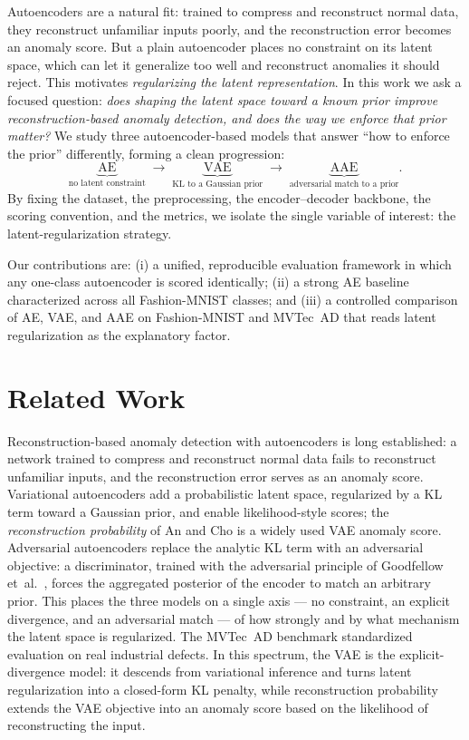 \documentclass[11pt]{article}
\begin{document}
Autoencoders are a natural fit: trained to compress and reconstruct normal data,
they reconstruct unfamiliar inputs poorly, and the reconstruction error becomes
an anomaly score. But a plain autoencoder places no constraint on its latent
space, which can let it generalize too well and reconstruct anomalies it should
reject. This motivates \emph{regularizing the latent representation}. In this
work we ask a focused question: \emph{does shaping the latent space toward a
known prior improve reconstruction-based anomaly detection, and does the way we
enforce that prior matter?} We study three autoencoder-based models that answer
``how to enforce the prior'' differently, forming a clean progression:
\[
\underbrace{\text{AE}}_{\text{no latent constraint}}
\;\longrightarrow\;
\underbrace{\text{VAE}}_{\text{KL to a Gaussian prior}}
\;\longrightarrow\;
\underbrace{\text{AAE}}_{\text{adversarial match to a prior}} .
\]
By fixing the dataset, the preprocessing, the encoder--decoder backbone, the
scoring convention, and the metrics, we isolate the single variable of interest:
the latent-regularization strategy.

Our contributions are: (i) a unified, reproducible evaluation framework in which
any one-class autoencoder is scored identically; (ii) a strong AE baseline
characterized across all Fashion-MNIST classes; and (iii) a controlled
comparison of AE, VAE, and AAE on Fashion-MNIST and MVTec~AD that reads latent
regularization as the explanatory factor.

\section{Related Work}   %
Reconstruction-based anomaly detection with autoencoders is long established:
a network trained to compress and reconstruct normal data fails to reconstruct
unfamiliar inputs, and the reconstruction error serves as an anomaly score.
Variational autoencoders \cite{kingma2013} add a probabilistic latent space,
regularized by a KL term toward a Gaussian prior, and enable likelihood-style
scores; the \emph{reconstruction probability} of An and Cho \cite{ancho2015} is a
widely used VAE anomaly score. Adversarial autoencoders \cite{makhzani2015}
replace the analytic KL term with an adversarial objective: a discriminator,
trained with the adversarial principle of Goodfellow et~al.\ \cite{goodfellow2014},
forces the aggregated posterior of the encoder to match an arbitrary prior. This
places the three models on a single axis --- no constraint, an explicit
divergence, and an adversarial match --- of how strongly and by what mechanism
the latent space is regularized. The MVTec~AD benchmark \cite{bergmann2019}
standardized evaluation on real industrial defects.
In this spectrum, the VAE is the explicit-divergence model: it descends from
variational inference and turns latent regularization into a closed-form KL
penalty, while reconstruction probability extends the VAE objective into an
anomaly score based on the likelihood of reconstructing the input.
\end{document}
